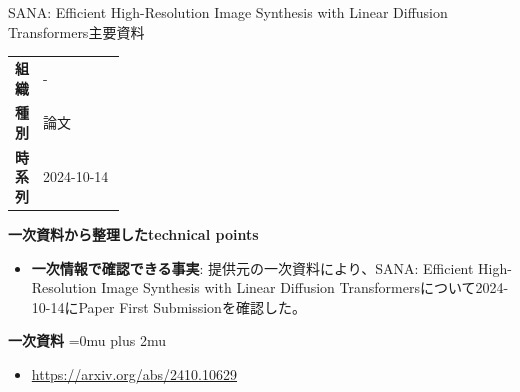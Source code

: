 \begin{technicalnote}{SANA: Efficient High-Resolution Image Synthesis with Linear Diffusion Transformers}{主要資料}
\begingroup
\begin{tabularx}{\linewidth}{@{}>{\bfseries}p{0.22\linewidth}X@{}}
組織 & - \\
種別 & 論文 \\
時系列 & 2024-10-14 \\
\end{tabularx}
\smallskip
{\bfseries 一次資料から整理したtechnical points}
\begin{itemize}[leftmargin=1.5em,itemsep=0.35em]
\item \textbf{一次情報で確認できる事実}: 提供元の一次資料により、SANA: Efficient High-Resolution Image Synthesis with Linear Diffusion Transformersについて2024-10-14にPaper First Submissionを確認した。
\end{itemize}
\begin{minipage}{\linewidth}
\begin{samepage}
{\bfseries 一次資料}
\begingroup\sloppy
\Urlmuskip=0mu plus 2mu\relax
\begin{itemize}[leftmargin=1.5em,itemsep=0.25em]
\item {\scriptsize\url{https://arxiv.org/abs/2410.10629}}
\end{itemize}
\endgroup
\end{samepage}
\end{minipage}
\endgroup
\end{technicalnote}
\medskip

